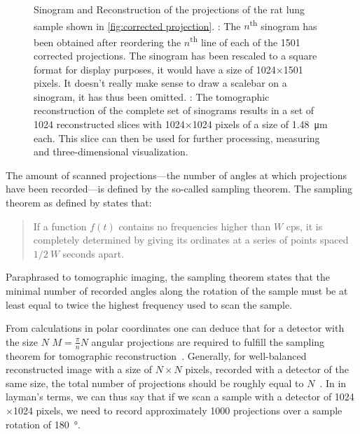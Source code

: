 \begin{figure}
{%
		\label{subfig:rec}%
		}%
	\caption[Sinogram and Reconstruction]{Sinogram and Reconstruction of the projections of the rat lung sample shown in \autoref{fig:corrected projection}. : The $n$\textsuperscript{th} sinogram has been obtained after reordering the $n$\textsuperscript{th} line of each of the 1501 corrected projections. The sinogram has been rescaled to a square format for display purposes, it would have a size of 1024$\times$1501 pixels. It doesn't really make sense to draw a scalebar on a sinogram, it has thus been omitted. : The tomographic reconstruction of the complete set of sinograms results in a set of 1024 reconstructed slices with 1024$\times$1024 pixels of a size of \SI{1.48}{\micro\meter} each. This slice can then be used for further processing, measuring and three-dimensional visualization.}
	\label{fig:Sin Rec}
\end{figure}

The amount of scanned projections---the number of angles at which projections have been recorded---is defined by the so-called sampling theorem. The sampling theorem as defined by \citet{Shannon1949} states that: \begin{quote}If a function $f(t)$ contains no frequencies higher than $W$ cps, it is completely determined by giving its ordinates at a series of points spaced $1/2\ W$ seconds apart. \cite{Shannon1949}\end{quote}

Paraphrased to tomographic imaging, the sampling theorem states that the minimal number of recorded angles along the rotation of the sample must be at least equal to twice the highest frequency used to scan the sample.

From calculations in polar coordinates one can deduce that for a detector with the size $N$ $M=\frac{\pi}{n}N$ angular projections are required to fulfill the sampling theorem for tomographic reconstruction~\cite{Stampanoni2002a}. Generally, for well-balanced reconstructed image with a size of $N\times N$ pixels, recorded with a detector of the same size, the total number of projections should be roughly equal to $N$~\cite{Kak2002}. In in layman's terms, we can thus say that if we scan a sample with a detector of 1024$\times$1024 pixels, we need to record approximately 1000 projections over a sample rotation of \SI{180}{\degree}.


